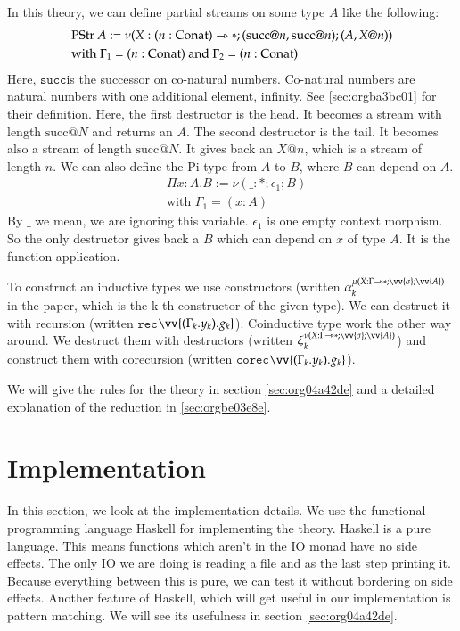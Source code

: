 \documentclass[a4paper,cleardoubleempty,BCOR1cm]{scrbook}
\begin{document}
In this theory, we can define partial streams on some type \(A\) like the following:
\begin{align*}
&\text{PStr }A := \nu(X:(n:\text{Conat})\rightarrowtriangle*;(\text{succ} @ n, \text{succ} @ n);(A, X @ n))\\
&\text{with } \Gamma_1 = (n:\text{Conat}) \text{ and } \Gamma_2 = (n:\text{Conat})
\end{align*}
Here, $\mathtt{succ}$\;is the successor on co-natural numbers.  Co-natural numbers are
natural numbers with one additional element, infinity. See \ref{sec:orgba3bc01}
for their definition. Here, the first destructor is the head. It becomes a
stream with length \(\text{succ} @ N\) and returns an \(A\). The second destructor
is the tail. It becomes also a stream of length \(\text{succ} @ N\). It gives
back an \(X @ n\), which is a stream of length \(n\). We can also define the Pi
type from \(A\) to \(B\), where \(B\) can depend on \(A\).
\begin{align*}
&\Pi x:A.B := \nu(\_:*;\epsilon_1;B)\\
&\text{with } \Gamma_1 = (x:A)
\end{align*}
By \(\_\) we mean, we are ignoring this variable. \(\epsilon_1\) is one empty
context morphism.  So the only destructor gives back a \(B\) which can depend
on \(x\) of type \(A\).  It is the function application.

To construct an inductive types we use constructors (written
\(\alpha_k^{\mu(X:\Gamma\rat*;\vv{\sigma};\vv{A})}\) in the paper, which is the k-th
constructor of the given type).  We can destruct it with recursion (written
$\mathtt{rec}$\;\(\vv{(\Gamma_k.y_k).g_k}\)).  Coinductive type work the other way around.
We destruct them with destructors (written
\(\xi_k^{\nu(X:\Gamma\rat*;\vv{\sigma};\vv{A})}\)) and construct them with
corecursion (written $\mathtt{corec}$\;\(\vv{(\Gamma_k.y_k).g_k}\)).

We will give the rules for the theory in section \ref{sec:org04a42de} and a detailed
explanation of the reduction in \ref{sec:orgbe03e8e}.

\chapter{Implementation}
\label{sec:org7c57481}
In this section, we look at the implementation details.  We use the functional
programming language Haskell for implementing the theory. Haskell is a pure
language. This means functions which aren't in the IO monad have no side
effects. The only IO we are doing is reading a file and as the last step
printing it. Because everything between this is pure, we can test it without
bordering on side effects. Another feature of Haskell, which will get
useful in our implementation is pattern matching. We will see its usefulness
in section \ref{sec:org04a42de}.
\end{document}
